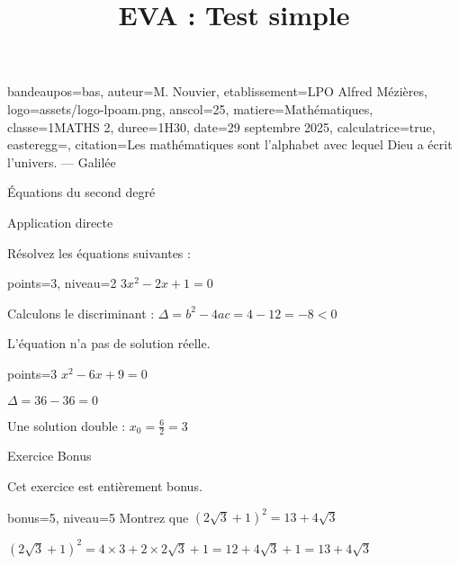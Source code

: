 \documentclass[correctionfin,theme=vert]{nfdevoirs}
\title{EVA : Test simple}
\begin{document}
\begin{devoir}{
        bandeaupos={bas},
        auteur={M. Nouvier},
        etablissement={LPO Alfred Mézières},
        logo={assets/logo-lpoam.png},
        anscol=25,
        matiere={Mathématiques},
        classe={1MATHS 2},
        duree={1H30},
        date={29 septembre 2025},
        calculatrice=true,
        easteregg={},
        citation={Les mathématiques sont l'alphabet avec lequel Dieu a écrit l'univers. --- Galilée}
    }

    \begin{partie}{Équations du second degré}

        \begin{exercice}{Application directe}

            Résolvez les équations suivantes :

            \begin{question}{points=3, niveau=2}
                $3x^2 - 2x + 1 = 0$
            \end{question}

            \begin{correction}
                Calculons le discriminant : $\Delta = b^2 - 4ac = 4 - 12 = -8 < 0$

                L'équation n'a pas de solution réelle.
            \end{correction}

            \begin{question}{points=3}
                $x^2 - 6x + 9 = 0$
            \end{question}

            \begin{correction}
                $\Delta = 36 - 36 = 0$

                Une solution double : $x_0 = \frac{6}{2} = 3$
            \end{correction}

        \end{exercice}

        \begin{exercice}{Exercice Bonus}

            Cet exercice est entièrement bonus.

            \begin{question}{bonus=5, niveau=5}
                Montrez que $(2\sqrt{3} + 1)^2 = 13 + 4\sqrt{3}$
            \end{question}

            \begin{correction}
                $(2\sqrt{3} + 1)^2 = 4 \times 3 + 2 \times 2\sqrt{3} + 1 = 12 + 4\sqrt{3} + 1 = 13 + 4\sqrt{3}$
            \end{correction}

        \end{exercice}

    \end{partie}

\end{devoir}
\end{document}
